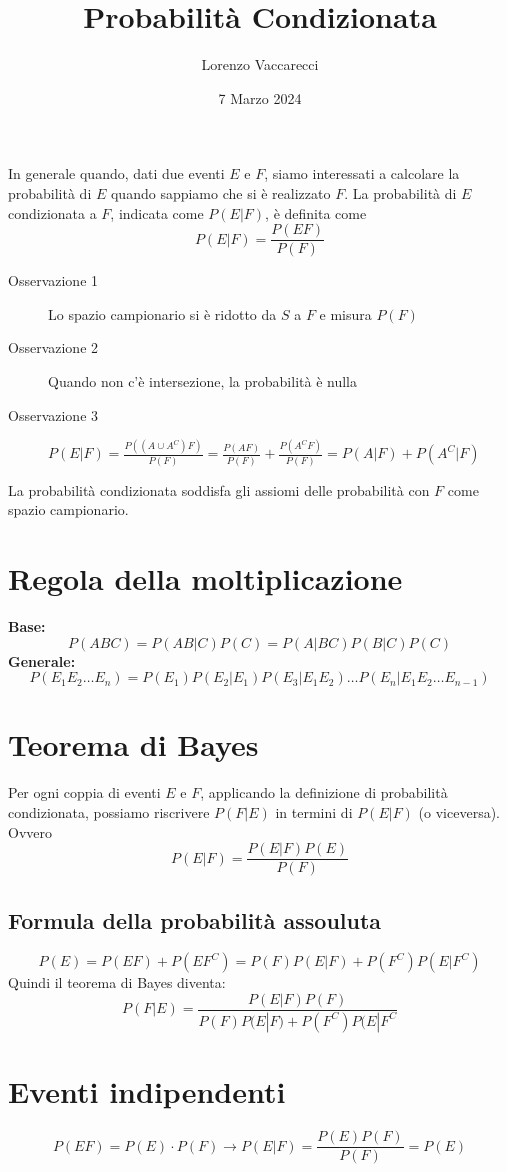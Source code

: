 \documentclass[12pt]{article}
\title{Probabilità Condizionata}
\author{Lorenzo Vaccarecci}
\date{7 Marzo 2024}
\begin{document}
\maketitle
In generale quando, dati due eventi $E$ e $F$, siamo interessati a calcolare la probabilità di $E$ quando sappiamo che si è realizzato $F$. La probabilità di $E$ condizionata a $F$, indicata come $P(E|F)$, è definita come
\begin{equation*}
    P(E|F)=\frac{P(EF)}{P(F)}
\end{equation*}
\begin{description}
    \item[Osservazione 1] Lo spazio campionario si è ridotto da $S$ a $F$ e misura $P(F)$
    \item[Osservazione 2] Quando non c'è intersezione, la probabilità è nulla
    \item[Osservazione 3] \(P(E|F)=\frac{P((A\cup A^{C})F)}{P(F)}=\frac{P(AF)}{P(F)}+\frac{P(A^{C}F)}{P(F)}=P(A|F)+P(A^{C}|F)\)  
\end{description}
La probabilità condizionata soddisfa gli assiomi delle probabilità con $F$ come spazio campionario.
\section{Regola della moltiplicazione}
\textbf{Base: } \begin{equation*}
    P(ABC)=P(AB|C)P(C)=P(A|BC)P(B|C)P(C)
\end{equation*}
\textbf{Generale: } \begin{equation*}
    P(E_{1}E_{2}\dots E_{n})=P(E_{1})P(E_{2}|E_{1})P(E_{3}|E_{1}E_{2})\dots P(E_{n}|E_{1}E_{2}\dots E_{n-1})
\end{equation*}
\section{Teorema di Bayes}
Per ogni coppia di eventi $E$ e $F$, applicando la definizione di probabilità condizionata, possiamo riscrivere $P(F|E)$ in termini di $P(E|F)$ (o viceversa). Ovvero
\begin{equation*}
    P(E|F) = \frac{P(E|F)P(E)}{P(F)}
\end{equation*}
\subsection*{Formula della probabilità assouluta}
\begin{equation*}
    P(E)=P(EF)+P(EF^{C})=P(F)P(E|F)+P(F^{C})P(E|F^{C})
\end{equation*}
Quindi il teorema di Bayes diventa:
\begin{equation*}
    P(F|E) = \frac{P(E|F)P(F)}{P(F)P(E|F)+P(F^{C})P(E|F^{C}}
\end{equation*}
\section{Eventi indipendenti}
\begin{equation*}
    P(EF)=P(E)\cdot P(F) \rightarrow P(E|F)=\frac{P(E)P(F)}{P(F)}=P(E)
\end{equation*}
\end{document}
